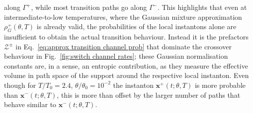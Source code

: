 along $\Gamma^{+}$, while most transition paths go along $\Gamma^{-}$.
This highlights that even at intermediate-to-low temperatures, where
the Gaussian mixture approximation $\rho_G^+(\theta, T)$ is
already valid, the probabilities of the local instantons alone are
insufficient to obtain the actual transition behaviour. Instead it
is the prefactors $\mathcal{Z^{\pm}}$ in Eq.~\ref{eq:approx transition channel prob}
that dominate the crossover behaviour in Fig.~\ref{fig:switch channel rates};
these Gaussian normalisation constants are, in a sense, an entropic
contribution, as they measure the effective volume in path space of
the support around the respective local instanton. Even though for
$T/T_{0}=2.4$, $\theta/\theta_{0}=10^{-2}$ the instanton $\mathbf{x}^{+}(t;\theta,T)$
is more probable than $\mathbf{x}^{-}(t;\theta,T)$, this is more than offset
by the larger number of paths that behave similar to $\mathbf{x}^{-}(t;\theta,T)$.

